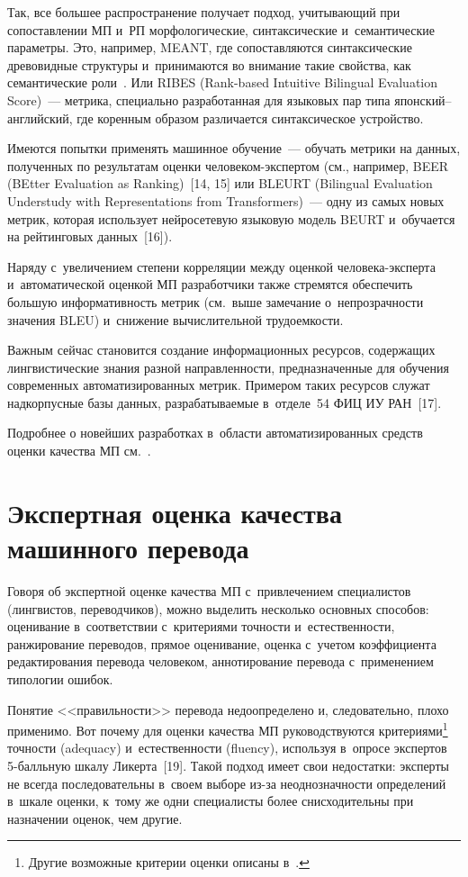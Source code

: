 \begin{multicols}{2}
  Так, все большее распространение получает подход, учитывающий при 
сопоставлении МП и~РП морфологические, синтаксические и~семантические 
параметры. Это, например, MEANT, где сопоставляются синтаксические 
древовидные структуры и~принимаются во внимание такие свойства, как 
семантические роли~\cite{13-nur}. Или RIBES (Rank-based Intuitive Bilingual 
Evaluation Score)~--- метрика, специально разработанная для языковых пар 
типа япон\-ский--анг\-лий\-ский, где коренным образом различается 
синтаксическое устройство.
  
  Имеются попытки применять машинное обуче\-ние~--- обучать метрики на 
данных, полученных по результатам оценки че\-ло\-ве\-ком-экс\-пер\-том (см., 
например, BEER (BEtter Evaluation as Ranking)~[14, 15] или \mbox{BLEURT} 
(Bilingual Evaluation Understudy with Representations from Transformers)~--- 
одну из самых новых мет\-рик, которая использует нейросетевую языковую 
модель \mbox{BEURT} и~обуча\-ет\-ся на рейтинговых данных~[16]).
  
  Наряду с~увеличением степени корреляции между оценкой 
  человека-эксперта и~автоматической оценкой МП разработчики также стремятся 
обеспечить большую информативность метрик (см.\ выше замечание 
о~непрозрачности значения BLEU) и~снижение вычислительной 
трудоемкости.
  
  Важным сейчас становится создание информационных ресурсов, 
содержащих лингвистические знания разной направленности, 
предназначенные для обучения современных автоматизированных метрик. 
Примером таких ресурсов служат надкорпусные базы данных, 
разрабатываемые в~отделе~54 ФИЦ ИУ РАН~[17].
  
  Подробнее о новейших разработках в~области автоматизированных 
средств оценки качества МП см.~\cite[с.~59--64]{10-nur}.
  
  \section{Экспертная оценка качества машинного перевода}
  
  Говоря об экспертной оценке качества МП с~привлечением специалистов 
(лингвистов, переводчиков), можно выделить несколько основных способов: 
оценивание в~соответствии с~критериями точности и~естественности, 
ранжирование переводов, прямое оценивание, оценка с~учетом коэффициента 
редактирования перевода человеком, аннотирование перевода с~применением 
типологии ошибок.
  
  Понятие <<правильности>> перевода недоопределено и, следовательно, 
плохо применимо. Вот почему для оценки качества МП руководствуются 
критериями\footnote{Другие возможные критерии оценки описаны в~\cite{18-nur}.} 
точности (adequacy) и~естественности (fluency), используя в~опросе 
экспертов 5-балль\-ную шкалу Ликерта~[19]. Такой подход имеет свои 
недостатки: эксперты не всегда последовательны в~своем выборе из-за 
неоднозначности определений в~шкале оценки, к~тому же одни специалисты 
более снисходительны при назначении оценок, чем другие.
  

\end{multicols}
